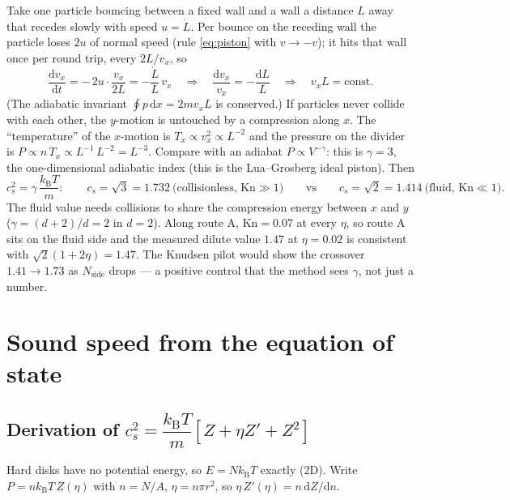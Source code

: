 \documentclass[11pt,a4paper]{article}
\newcommand{\kT}{k_{\mathrm B}T}
\newcommand{\dd}{\mathrm{d}}
\begin{document}
Take one particle bouncing between a fixed wall and a wall a distance $L$ away that recedes slowly with speed $u = \dot L$. Per bounce on the receding wall the particle loses $2u$ of normal speed (rule \eqref{eq:piston} with $v \to -v$); it hits that wall once per round trip, every $2L/v_x$, so
\begin{equation}
\frac{\dd v_x}{\dd t} = -\,2u\cdot\frac{v_x}{2L} = -\frac{\dot L}{L}\,v_x
\quad\Longrightarrow\quad
\frac{\dd v_x}{v_x} = -\frac{\dd L}{L}
\quad\Longrightarrow\quad v_x L = \text{const}.
\end{equation}
(The adiabatic invariant $\oint p\,\dd x = 2 m v_x L$ is conserved.) If particles never collide with each other, the $y$-motion is untouched by a compression along $x$. The ``temperature'' of the $x$-motion is $T_x \propto v_x^2 \propto L^{-2}$ and the pressure on the divider is $P \propto n\,T_x \propto L^{-1}\,L^{-2} = L^{-3}$. Compare with an adiabat $P \propto V^{-\gamma}$: this is $\gamma = 3$, the one-dimensional adiabatic index (this is the Lua--Grosberg ideal piston). Then
\begin{equation}
c_s^2 = \gamma\,\frac{\kT}{m}:\qquad
c_s = \sqrt3 = 1.732\ \text{(collisionless, }\mathrm{Kn}\gg1)
\qquad\text{vs}\qquad
c_s = \sqrt2 = 1.414\ \text{(fluid, }\mathrm{Kn}\ll1).
\end{equation}
The fluid value needs collisions to share the compression energy between $x$ and $y$ ($\gamma = (d+2)/d = 2$ in $d = 2$). Along route A, $\mathrm{Kn} = 0.07$ at every $\eta$, so route A sits on the fluid side and the measured dilute value $1.47$ at $\eta = 0.02$ is consistent with $\sqrt2(1+2\eta) = 1.47$. The Knudsen pilot would show the crossover $1.41 \to 1.73$ as $N_{\mathrm{side}}$ drops --- a positive control that the method sees $\gamma$, not just a number.

\section{Sound speed from the equation of state}

\subsection{Derivation of \texorpdfstring{$c_s^2 = \dfrac{\kT}{m}\left[Z + \eta Z' + Z^2\right]$}{the adiabatic mapping}}
Hard disks have no potential energy, so $E = N\kT$ exactly (2D). Write $P = n\kT\,Z(\eta)$ with $n = N/A$, $\eta = n\pi r^2$, so $\eta\, Z'(\eta) = n\,\dd Z/\dd n$.
\end{document}

